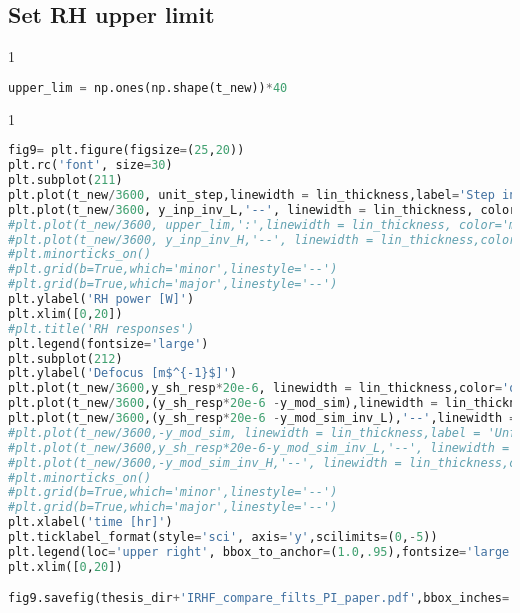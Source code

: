 
\hypertarget{set-rh-upper-limit}{%
\subsection{Set RH upper limit}\label{set-rh-upper-limit}}

\begin{spacing}{1} \begin{lstlisting}[language=Python]
upper_lim = np.ones(np.shape(t_new))*40
\end{lstlisting} \end{spacing}

\begin{spacing}{1} \begin{lstlisting}[language=Python]
fig9= plt.figure(figsize=(25,20))
plt.rc('font', size=30)
plt.subplot(211)
plt.plot(t_new/3600, unit_step,linewidth = lin_thickness,label='Step input', color= 'purple')
plt.plot(t_new/3600, y_inp_inv_L,'--', linewidth = lin_thickness, color = 'green',label='Filtered input')
#plt.plot(t_new/3600, upper_lim,':',linewidth = lin_thickness, color='magenta', label='RH upper limit')
#plt.plot(t_new/3600, y_inp_inv_H,'--', linewidth = lin_thickness,color = 'red', label='Filtered input (H$^{-1}$(s)G$_{1}$(s))')
#plt.minorticks_on()
#plt.grid(b=True,which='minor',linestyle='--')
#plt.grid(b=True,which='major',linestyle='--')
plt.ylabel('RH power [W]')
plt.xlim([0,20])
#plt.title('RH responses')
plt.legend(fontsize='large')
plt.subplot(212)
plt.ylabel('Defocus [m$^{-1}$]')
plt.plot(t_new/3600,y_sh_resp*20e-6, linewidth = lin_thickness,color='orange',label ='central heating with no RH')
plt.plot(t_new/3600,(y_sh_resp*20e-6 -y_mod_sim),linewidth = lin_thickness,label='central heating + RH w/ step input',color='purple')
plt.plot(t_new/3600,(y_sh_resp*20e-6 -y_mod_sim_inv_L),'--',linewidth = lin_thickness,label='central heating + RH w/ filtered input',color='green')
#plt.plot(t_new/3600,-y_mod_sim, linewidth = lin_thickness,label = 'Unfiltered step input',color='purple')
#plt.plot(t_new/3600,y_sh_resp*20e-6-y_mod_sim_inv_L,'--', linewidth = lin_thickness,color='green',label ='Filtered input (H$^{-1}$(s)G$_{2}$(s))')
#plt.plot(t_new/3600,-y_mod_sim_inv_H,'--', linewidth = lin_thickness,color='red',label ='Filtered input (H$^{-1}$(s)G$_{1}$(s))')
#plt.minorticks_on()
#plt.grid(b=True,which='minor',linestyle='--')
#plt.grid(b=True,which='major',linestyle='--')
plt.xlabel('time [hr]')
plt.ticklabel_format(style='sci', axis='y',scilimits=(0,-5))
plt.legend(loc='upper right', bbox_to_anchor=(1.0,.95),fontsize='large')
plt.xlim([0,20])

fig9.savefig(thesis_dir+'IRHF_compare_filts_PI_paper.pdf',bbox_inches='tight')
\end{lstlisting} \end{spacing}

